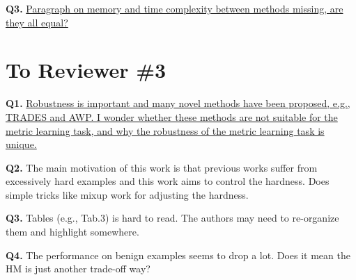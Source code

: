 \documentclass[10pt,twocolumn,letterpaper]{article}
\begin{document}
\noindent\textbf{Q3.}
%
\ul{
Paragraph on memory and time complexity between methods missing, are they all
equal?
}

\section*{To Reviewer \#3}

\noindent\textbf{Q1.}
%
\ul{
Robustness is important and many novel methods have been proposed, e.g., TRADES and AWP. I wonder whether these methods are not suitable for the metric learning task, and why the robustness of the metric learning task is unique.
}

\noindent\textbf{Q2.}
%
The main motivation of this work is that previous works suffer from excessively hard examples and this work aims to control the hardness. Does simple tricks like mixup work for adjusting the hardness.

\noindent\textbf{Q3.}
%
Tables (e.g., Tab.3) is hard to read. The authors may need to re-organize them and highlight somewhere.

\noindent\textbf{Q4.}
%
The performance on benign examples seems to drop a lot. Does it mean the HM is just another trade-off way?

{\small


}
\end{document}

